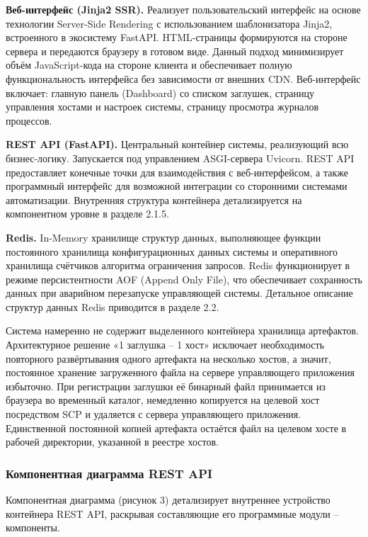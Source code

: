 \documentclass[
]{article}
\begin{document}
\textbf{Веб-интерфейс (Jinja2 SSR).} Реализует пользовательский
интерфейс на основе технологии Server-Side Rendering с использованием
шаблонизатора Jinja2, встроенного в экосистему FastAPI. HTML-страницы
формируются на стороне сервера и передаются браузеру в готовом виде.
Данный подход минимизирует объём JavaScript-кода на стороне клиента и
обеспечивает полную функциональность интерфейса без зависимости от
внешних CDN. Веб-интерфейс включает: главную панель (Dashboard) со
списком заглушек, страницу управления хостами и настроек системы,
страницу просмотра журналов процессов.

\textbf{REST API (FastAPI).} Центральный контейнер системы, реализующий
всю бизнес-логику. Запускается под управлением ASGI-сервера Uvicorn.
REST API предоставляет конечные точки для взаимодействия с
веб-интерфейсом, а также программный интерфейс для возможной интеграции
со сторонними системами автоматизации. Внутренняя структура контейнера
детализируется на компонентном уровне в разделе 2.1.5.

\textbf{Redis.} In-Memory хранилище структур данных, выполняющее функции
постоянного хранилища конфигурационных данных системы и оперативного
хранилища счётчиков алгоритма ограничения запросов. Redis функционирует
в режиме персистентности AOF (Append Only File), что обеспечивает
сохранность данных при аварийном перезапуске управляющей системы.
Детальное описание структур данных Redis приводится в разделе 2.2.

Система намеренно не содержит выделенного контейнера хранилища
артефактов. Архитектурное решение «1 заглушка -- 1 хост» исключает
необходимость повторного развёртывания одного артефакта на несколько
хостов, а значит, постоянное хранение загруженного файла на сервере
управляющего приложения избыточно. При регистрации заглушки её бинарный
файл принимается из браузера во временный каталог, немедленно копируется
на целевой хост посредством SCP и удаляется с сервера управляющего
приложения. Единственной постоянной копией артефакта остаётся файл на
целевом хосте в рабочей директории, указанной в реестре хостов.

\subsubsection{Компонентная диаграмма REST
API}\label{ux43aux43eux43cux43fux43eux43dux435ux43dux442ux43dux430ux44f-ux434ux438ux430ux433ux440ux430ux43cux43cux430-rest-api}

Компонентная диаграмма (рисунок 3) детализирует внутреннее устройство
контейнера REST API, раскрывая составляющие его программные модули --
компоненты.
\end{document}

